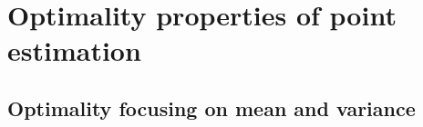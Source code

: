 

\chapter{Optimality properties of point estimation}

\section{Optimality focusing on mean and variance}

